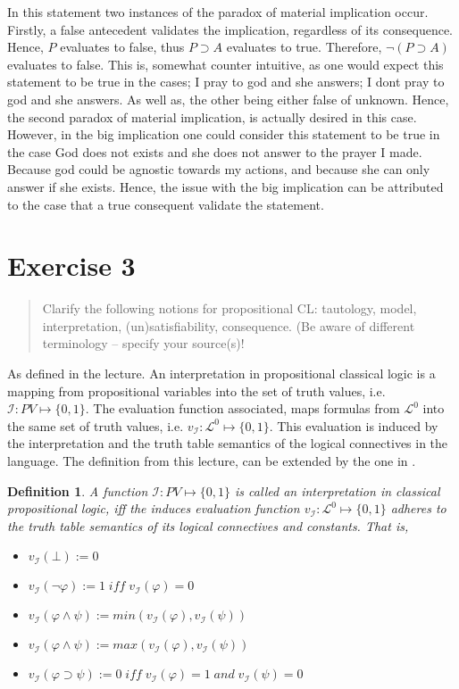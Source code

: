 \documentclass[11pt,a4paper]{article}
\newtheorem{mydef}{Definition}
\begin{document}
In this statement two instances of the paradox of material implication occur. Firstly, a false antecedent  validates the implication, regardless of its consequence. Hence, $P$ evaluates to false, thus $P \supset A$ evaluates to true. Therefore, $\neg ( P \supset A)$ evaluates to false. This is, somewhat counter intuitive, as one would expect this statement to be true in the cases; I pray to god and she answers; I dont pray to god and she answers. As well as, the other being either false of unknown. Hence, the second paradox of material implication, is actually desired in this case. However, in the big implication one could consider this statement to be true in the case God does not exists and she does not answer to the prayer I made. Because god could be agnostic towards my actions, and because she can only answer if she exists. Hence, the issue with the big implication can be attributed to the case that a true consequent validate the statement.


\section*{Exercise 3}
\begin{quote}
Clarify the following notions for propositional CL:
tautology, model, interpretation, (un)satisfiability, consequence. (Be aware of different terminology – specify your source(s)!
\end{quote}


As defined in the lecture. An interpretation in propositional classical logic is a mapping from propositional variables into the set of truth values, i.e. $\mathcal{I}: PV \mapsto \{0,1\}$.
The evaluation function associated, maps formulas from $\mathcal{L}^0$ into the same set of truth values, i.e. $v_{\mathcal{I}}:\mathcal{L}^0 \mapsto \{0,1\}$. This evaluation is induced by the interpretation and the truth table semantics of the logical connectives in the language. The definition from this lecture, can be extended by the one in \cite{LoCo}.

\begin{mydef}
A function $\mathcal{I}:PV \mapsto \{0,1\}$ is called an interpretation in classical propositional logic, iff the induces evaluation function $v_{\mathcal{I}}:\mathcal{L}^0 \mapsto \{0,1\}$ adheres to the truth table semantics of its logical connectives and constants. That is,
\begin{itemize}
\item $v_{\mathcal{I}}(\bot):=0$
\item $v_{\mathcal{I}}(\neg \varphi):= 1 \;\mathit{ iff } \;v_{\mathcal{I}}(\varphi)=0$
\item $v_{\mathcal{I}}(\varphi \land \psi):=min(v_{\mathcal{I}}(\varphi),v_{\mathcal{I}}(\psi))$
\item $v_{\mathcal{I}}(\varphi \land \psi):=max(v_{\mathcal{I}}(\varphi),v_{\mathcal{I}}(\psi))$
\item $v_{\mathcal{I}}(\varphi \supset \psi):=0 \;\mathit{ iff }\; v_{\mathcal{I}}(\varphi)=1 \;\mathit{ and }\; v_{\mathcal{I}}(\psi)=0$
\end{itemize}
\end{mydef}
\end{document}
